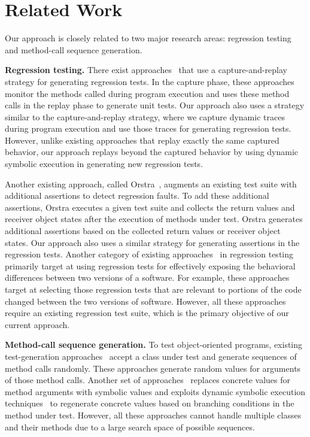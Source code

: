 \section{Related Work}
\label{sec:related}

Our approach is closely related to two major research areas: regression testing and method-call sequence generation.

\textbf{Regression testing.} There exist approaches~\cite{Elbaum:capture, orso:capture, david:java} that use a capture-and-replay strategy for generating regression tests. In the capture phase, these approaches monitor the methods called during program execution and uses these method calls in the replay phase to generate unit tests. Our approach also uses a strategy similar to the capture-and-replay strategy, where we capture dynamic traces during program execution and use those traces for generating regression tests. However, unlike existing approaches that replay exactly the same captured behavior, our approach replays beyond the captured behavior by using dynamic symbolic execution in generating new regression tests.

Another existing approach, called Orstra~\cite{xie06:augmenting}, augments an existing test suite with additional assertions to detect regression faults. To add these additional assertions, Orstra executes a given test suite and collects the return values and receiver object states after the execution of methods under test. Orstra generates additional assertions based on the collected return values or receiver object states. Our approach also uses a similar strategy for generating assertions in the regression tests. Another category of existing approaches~\cite{DeMillo91:constraint, taneja08:diffgen, evans07:differential} in regression testing primarily target at using regression tests for effectively exposing the behavioral differences between two versions of a software. For example, these approaches target at selecting those regression tests that are relevant to portions of the code changed between the two versions of software. However, all these approaches require an existing regression test suite, which is the primary objective of our current approach.

\textbf{Method-call sequence generation.} To test object-oriented programs, existing test-generation approaches~\cite{csallner:jcrasher, JTEST, pacheco:eclat, xie:rostra} accept a class under test and generate sequences of method calls randomly. These approaches generate random values for arguments of those method calls. Another set of approaches~\cite{inkumsah08:improving} replaces concrete values for method arguments with symbolic values and exploits dynamic symbolic execution techniques~\cite{Clarke:symbolic, godefroid:dart, king:symex, koushik:cute} to regenerate concrete values based on branching conditions in the method under test. However, all these approaches cannot handle multiple classes and their methods due to a large search space of possible sequences.

